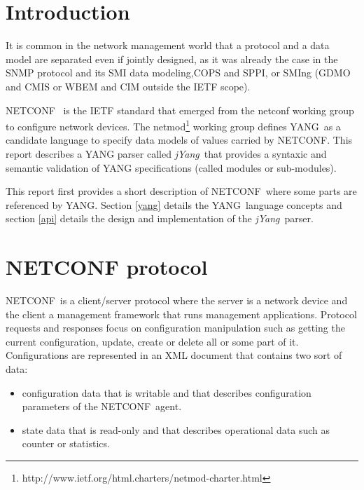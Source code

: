 \documentclass[a4paper]{article}
\newcommand{\jyang}{{\sl jYang}}
\newcommand{\nc}{NETCONF}
\newcommand{\y}{YANG}
\begin{document}
\makeRT  %


\lstset{numbers=left, numberstyle=\tiny, stepnumber=1, numbersep=5pt}

\section{Introduction}

It is common  in the network management world that  a protocol and a
data model are  separated even if jointly designed,  as it was already
the case in the  SNMP\cite{rfc1157} protocol and its SMI\cite{rfc1155}
data   modeling,CO\-PS\cite{rfc2748}   and  SP\-PI\cite{rfc3159},   or
SMI\-ng\cite{rfc3780} (GDMO and CMIS or  WBEM and CIM outside the IETF
scope).

\nc\ \cite{rfc4741} is the IETF standard that emerged from the netconf
working     group    to     configure     network    devices.      The
netmod\footnote{http://www.ietf.org/html.charters/netmod-charter.html}
working  group defines  \y\ as  a candidate  language to  specify data
models of values  carried by \nc.  This report  describes a YANG parser
called  \jyang\ that provides  a syntaxic  and semantic  validation of
YANG specifications (called modules or sub-modules).

This  report first  provides a  short description  of \nc\  where some
parts  are referenced  by  \y.  Section  \ref{yang}  details the  \y\
language  concepts   and section \ref{api}  details  the   design  and
implementation of the \jyang\ parser.


\section{NETCONF protocol}

\nc\ is a client/server protocol  where the server is a network device
and   the  client   a  management   framework  that   runs  management
applications. Protocol  requests and responses  focus on configuration
manipulation such as getting the current configuration, update, create
or delete all or some part of it. Configurations are represented in an
XML document that contains two sort of data:
\begin{itemize}
\item
configuration  data   that  is  writable   and  that  describes
configuration parameters of the \nc\  agent.
\item
state data that is read-only and that describes operational data such
as counter or statistics.
\end{itemize}
\end{document}
